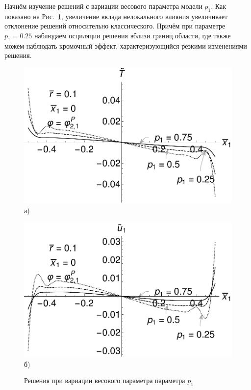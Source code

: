 Начнём изучение решений с вариации весового параметра модели $p_1$. Как показано на Рис.~\ref{fig:VariationP1}, увеличение вклада нелокального влияния увеличивает отклонение решений относительно классического. Причём при параметре $p_1 = 0.25$ наблюдаем осциляции решения вблизи границ области, где также можем наблюдать кромочный эффект, характеризующийся резкими изменениями решения.

\begin{figure}[ht]
    \begin{minipage}[b][][b]{0.49\linewidth}\centering
        \includegraphics[width=\linewidth]{pics/TVarP1.pdf} \\ а)
    \end{minipage}
    \hfill
    \begin{minipage}[b][][b]{0.49\linewidth}\centering
        \includegraphics[width=\linewidth]{pics/U1VarP1.pdf} \\ б)
    \end{minipage}
    \caption{Решения при вариации весового параметра параметра $p_1$}
    \label{fig:VariationP1}
\end{figure}

